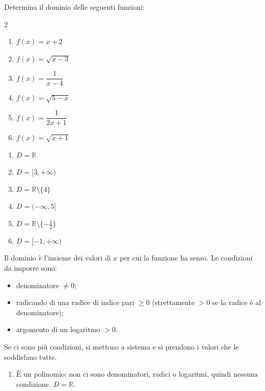 
\begin{question}[ID=1.1, subtitle={Determinazione del dominio di una funzione}, difficulty=facile, tags={funzioni, dominio}]
Determina il dominio delle seguenti funzioni:
\begin{multicols}{2}
\begin{enumerate}[leftmargin=3.2cm]
    \item $f(x)=x+2$
    \item $f(x)=\sqrt{x-3}$
    \item $f(x)=\dfrac{1}{x-4}$
    \item $f(x)=\sqrt{5-x}$
    \item $f(x)=\dfrac{1}{2x+1}$
    \item $f(x)=\sqrt{x+1}$
\end{enumerate}
\end{multicols}
\begin{solution}
\begin{enumerate}
    \item $D=\mathbb{R}$
    \item $D=[3,+\infty)$
    \item $D=\mathbb{R}\setminus\{4\}$
    \item $D=(-\infty,5]$
    \item $D=\mathbb{R}\setminus\{-\tfrac12\}$
    \item $D=[-1,+\infty)$
\end{enumerate}
\end{solution}
\begin{explanation}
Il dominio è l'insieme dei valori di $x$ per cui la funzione ha senso. Le condizioni da imporre sono:
\begin{itemize}
    \item denominatore $\neq 0$;
    \item radicando di una radice di indice pari $\geq 0$ (strettamente $>0$ se la radice è al denominatore);
    \item argomento di un logaritmo $>0$.
\end{itemize}
Se ci sono più condizioni, si mettono a sistema e si prendono i valori che le soddisfano tutte.
\begin{enumerate}
    \item È un polinomio: non ci sono denominatori, radici o logaritmi, quindi nessuna condizione. $D=\mathbb{R}$.

\end{enumerate}
\end{explanation}
\end{question}
